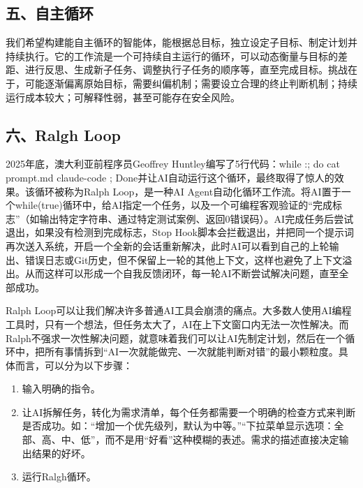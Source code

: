 \hypertarget{ux4e94ux81eaux4e3bux5faaux73af}{%
\subsection{五、自主循环}\label{ux4e94ux81eaux4e3bux5faaux73af}}

我们希望构建能自主循环的智能体，能根据总目标，独立设定子目标、制定计划并持续执行。它的工作流是一个可持续自主运行的循环，可以动态衡量与目标的差距、进行反思、生成新子任务、调整执行子任务的顺序等，直至完成目标。挑战在于，可能逐渐偏离原始目标，需要纠偏机制；需要设立合理的终止判断机制；持续运行成本较大；可解释性弱，甚至可能存在安全风险。

\hypertarget{ux516dralgh-loop}{%
\subsection{六、Ralgh Loop}\label{ux516dralgh-loop}}

2025年底，澳大利亚前程序员Geoffrey Huntley编写了5行代码：while :; do cat prompt.md \textbar{} claude-code ; Done并让AI自动运行这个循环，最终取得了惊人的效果。该循环被称为Ralph Loop，是一种AI Agent自动化循环工作流。将AI置于一个while(true)循环中，给AI指定一个任务，以及一个可编程客观验证的``完成标志''（如输出特定字符串、通过特定测试案例、返回0错误码）。AI完成任务后尝试退出，如果没有检测到完成标志，Stop Hook脚本会拦截退出，并把同一个提示词再次送入系统，开启一个全新的会话重新解决，此时AI可以看到自己的上轮输出、错误日志或Git历史，但不保留上一轮的其他上下文，这样也避免了上下文溢出。从而这样可以形成一个自我反馈闭环，每一轮AI不断尝试解决问题，直至全部成功。

Ralph Loop可以让我们解决许多普通AI工具会崩溃的痛点。大多数人使用AI编程工具时，只有一个想法，但任务太大了，AI在上下文窗口内无法一次性解决。而Ralph不强求一次性解决问题，就意味着我们可以让AI先制定计划，然后在一个循环中，把所有事情拆到``AI一次就能做完、一次就能判断对错''的最小颗粒度。具体而言，可以分为以下步骤：

\begin{enumerate}
\def\labelenumi{\arabic{enumi}.}
\item
  输入明确的指令。
\item
  让AI拆解任务，转化为需求清单，每个任务都需要一个明确的检查方式来判断是否成功。如：``增加一个优先级列，默认为中等。''``下拉菜单显示选项：全部、高、中、低''，而不是用``好看''这种模糊的表述。需求的描述直接决定输出结果的好坏。
\item
  运行Ralgh循环。
\end{enumerate}

